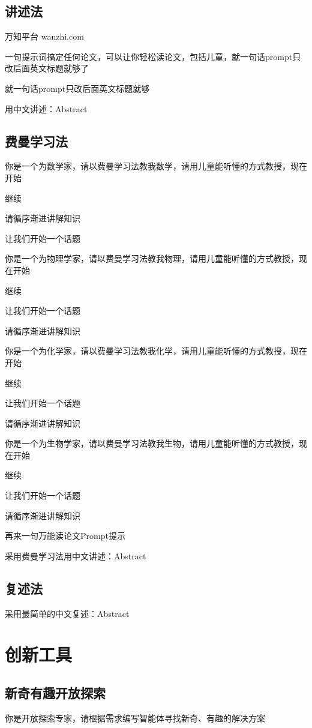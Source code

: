 \documentclass[12pt]{book}
\begin{document}
\section{讲述法}
万知平台 wanzhi.com

一句提示词搞定任何论文，可以让你轻松读论文，包括儿童，就一句话prompt只改后面英文标题就够了

就一句话prompt只改后面英文标题就够


用中文讲述：Abstract





\section{费曼学习法}

你是一个为数学家，请以费曼学习法教我数学，请用儿童能听懂的方式教授，现在开始

继续

请循序渐进讲解知识

让我们开始一个{话题}


你是一个为物理学家，请以费曼学习法教我物理，请用儿童能听懂的方式教授，现在开始

继续

让我们开始一个{话题}

请循序渐进讲解知识

你是一个为化学家，请以费曼学习法教我化学，请用儿童能听懂的方式教授，现在开始

继续

让我们开始一个{话题}

请循序渐进讲解知识

你是一个为生物学家，请以费曼学习法教我生物，请用儿童能听懂的方式教授，现在开始

继续

让我们开始一个{话题}


请循序渐进讲解知识


再来一句万能读论文Prompt提示

采用费曼学习法用中文讲述：Abstract

\section{复述法}

采用最简单的中文复述：Abstract

\chapter{创新工具}
\section{新奇有趣开放探索}
你是开放探索专家，请根据需求编写智能体寻找新奇、有趣的解决方案\\
\end{document}
